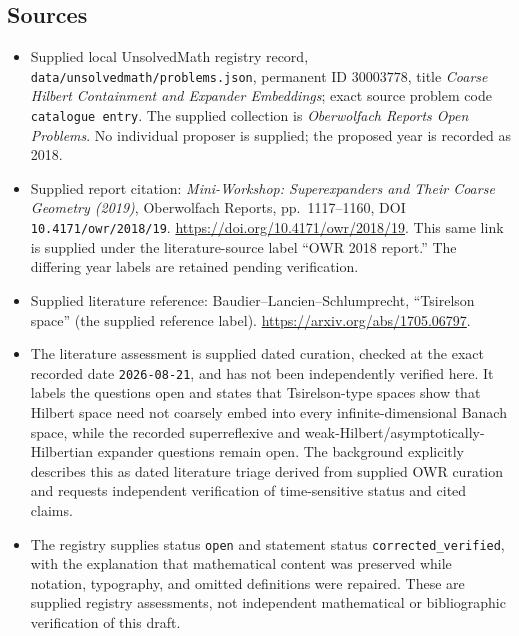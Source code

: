 \documentclass[11pt]{article}
\begin{document}
\subsection{Sources}
\begin{itemize}
\item Supplied local UnsolvedMath registry record, \texttt{data/unsolvedmath/problems.json}, permanent ID \(30003778\), title \emph{Coarse Hilbert Containment and Expander Embeddings}; exact source problem code \texttt{catalogue entry}. The supplied collection is \emph{Oberwolfach Reports Open Problems}. No individual proposer is supplied; the proposed year is recorded as 2018.
\item Supplied report citation: \emph{Mini-Workshop: Superexpanders and Their Coarse Geometry (2019)}, Oberwolfach Reports, pp.\ 1117--1160, DOI \texttt{10.4171/owr/2018/19}. \url{https://doi.org/10.4171/owr/2018/19}. This same link is supplied under the literature-source label ``OWR 2018 report.'' The differing year labels are retained pending verification.
\item Supplied literature reference: Baudier--Lancien--Schlumprecht, ``Tsirelson space'' (the supplied reference label). \url{https://arxiv.org/abs/1705.06797}.
\item The literature assessment is supplied dated curation, checked at the exact recorded date \texttt{2026-08-21}, and has not been independently verified here. It labels the questions open and states that Tsirelson-type spaces show that Hilbert space need not coarsely embed into every infinite-dimensional Banach space, while the recorded superreflexive and weak-Hilbert/asymptotically-Hilbertian expander questions remain open. The background explicitly describes this as dated literature triage derived from supplied OWR curation and requests independent verification of time-sensitive status and cited claims.
\item The registry supplies status \texttt{open} and statement status \texttt{corrected\_verified}, with the explanation that mathematical content was preserved while notation, typography, and omitted definitions were repaired. These are supplied registry assessments, not independent mathematical or bibliographic verification of this draft.
\end{itemize}
\end{document}
